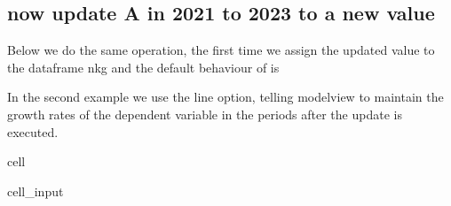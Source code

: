 \documentclass[letterpaper,10pt,english]{jupyterBook}
\begin{document}
\subsection{now update A in 2021 to 2023 to a new value}
\label{\detokenize{content/04_PythonEssentials/UpdateCommand:now-update-a-in-2021-to-2023-to-a-new-value}}
\sphinxAtStartPar
Below we do the same operation, the first time we assign the updated value to the dataframe nkg and the default behaviour of  is 

\sphinxAtStartPar
In the second example we use the  line option, telling modelview to maintain the growth rates of the dependent variable in the periods after the update is executed.

\begin{sphinxuseclass}{cell}\begin{sphinxVerbatimInput}

\begin{sphinxuseclass}{cell_input}
\begin{sphinxVerbatim}[commandchars=\\\{\}]
  

  


\end{sphinxVerbatim}


\end{sphinxuseclass}
\end{sphinxVerbatimInput}
\end{sphinxuseclass}
\end{document}
